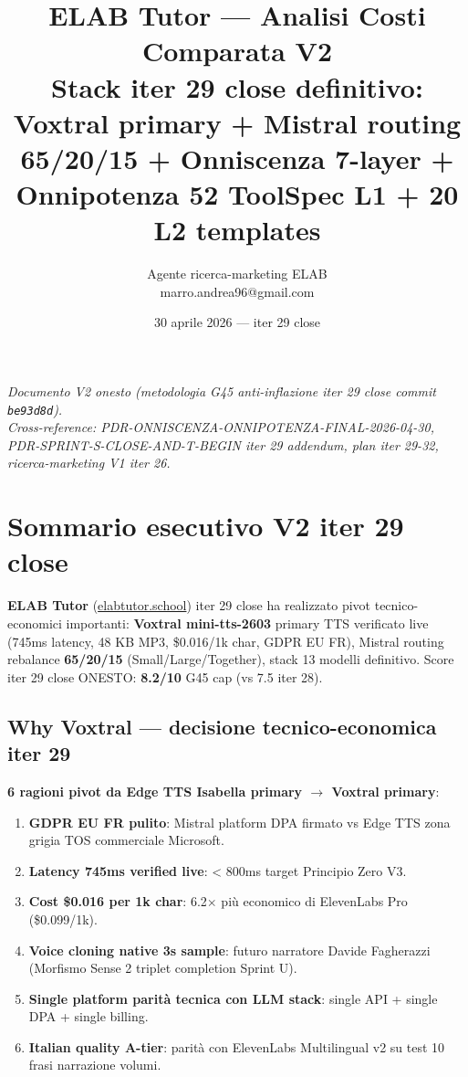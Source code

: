 \documentclass[12pt,a4paper]{article}
\title{\color{elabnavy}\textbf{ELAB Tutor --- Analisi Costi Comparata V2}\\
\large Stack iter 29 close definitivo: Voxtral primary + Mistral routing 65/20/15 + Onniscenza 7-layer + Onnipotenza 52 ToolSpec L1 + 20 L2 templates}
\author{Agente ricerca-marketing ELAB \\ marro.andrea96@gmail.com}
\date{30 aprile 2026 --- iter 29 close}
\begin{document}
\maketitle
\thispagestyle{empty}

\begin{center}
\color{elabgray}\textit{Documento V2 onesto (metodologia G45 anti-inflazione iter 29 close commit \texttt{be93d8d}). \\
Cross-reference: PDR-ONNISCENZA-ONNIPOTENZA-FINAL-2026-04-30, PDR-SPRINT-S-CLOSE-AND-T-BEGIN iter 29 addendum, plan iter 29-32, ricerca-marketing V1 iter 26.}
\end{center}

\vspace{0.3cm}

\tableofcontents
\newpage

\section{Sommario esecutivo V2 iter 29 close}

\textbf{ELAB Tutor} (\href{https://www.elabtutor.school}{elabtutor.school}) iter 29 close ha realizzato pivot tecnico-economici importanti: \textbf{Voxtral mini-tts-2603} primary TTS verificato live (745ms latency, 48 KB MP3, \$0.016/1k char, GDPR EU FR), Mistral routing rebalance \textbf{65/20/15} (Small/Large/Together), stack 13 modelli definitivo. Score iter 29 close ONESTO: \textbf{8.2/10} G45 cap (vs 7.5 iter 28).

\subsection*{Why Voxtral --- decisione tecnico-economica iter 29}

\textbf{6 ragioni pivot da Edge TTS Isabella primary $\rightarrow$ Voxtral primary}:

\begin{enumerate}[leftmargin=*]
  \item \textbf{GDPR EU FR pulito}: Mistral platform DPA firmato vs Edge TTS zona grigia TOS commerciale Microsoft.
  \item \textbf{Latency 745ms verified live}: < 800ms target Principio Zero V3.
  \item \textbf{Cost \$0.016 per 1k char}: 6.2$\times$ più economico di ElevenLabs Pro (\$0.099/1k).
  \item \textbf{Voice cloning native 3s sample}: futuro narratore Davide Fagherazzi (Morfismo Sense 2 triplet completion Sprint U).
  \item \textbf{Single platform parità tecnica con LLM stack}: single API + single DPA + single billing.
  \item \textbf{Italian quality A-tier}: parità con ElevenLabs Multilingual v2 su test 10 frasi narrazione volumi.
\end{enumerate}
\end{document}
